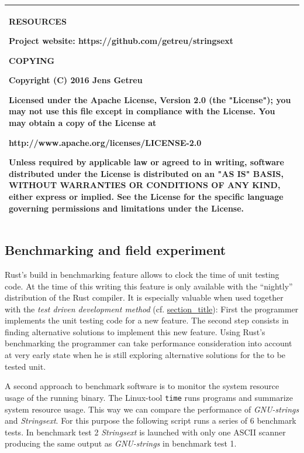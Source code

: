 \begin{longtable}[]{@{}l@{}}
\begin{minipage}[t]{0.97\columnwidth}
\textbf{RESOURCES}

\textbf{Project website:} https://github.com/getreu/stringsext

\textbf{COPYING}

Copyright (C) 2016 Jens Getreu

Licensed under the Apache License, Version 2.0 (the "License"); you may
not use this file except in compliance with the License. You may obtain
a copy of the License at

http://www.apache.org/licenses/LICENSE-2.0

Unless required by applicable law or agreed to in writing, software
distributed under the License is distributed on an "AS IS" BASIS,
WITHOUT WARRANTIES OR CONDITIONS OF ANY KIND, either express or implied.
See the License for the specific language governing permissions and
limitations under the License.\strut
\end{minipage}\tabularnewline
\bottomrule
\end{longtable}

\hypertarget{_benchmarking_and_field_experiment}{\subsection{Benchmarking
and field experiment}\label{_benchmarking_and_field_experiment}}

Rust's build in benchmarking feature allows to clock the time of unit
testing code. At the time of this writing this feature is only available
with the ``nightly'' distribution of the Rust compiler. It is especially
valuable when used together with the \emph{test driven development
method} (cf.
\protect\hyperlink{_test_driven_development}{section\_title}): First the
programmer implements the unit testing code for a new feature. The
second step consists in finding alternative solutions to implement this
new feature. Using Rust's benchmarking the programmer can take
performance consideration into account at very early state when he is
still exploring alternative solutions for the to be tested unit.

A second approach to benchmark software is to monitor the system
resource usage of the running binary. The Linux-tool \texttt{time} runs
programs and summarize system resource usage. This way we can compare
the performance of \emph{GNU-strings} and \emph{Stringsext}. For this
purpose the following script runs a series of 6 benchmark tests. In
benchmark test 2 \emph{Stringsext} is launched with only one ASCII
scanner producing the same output as \emph{GNU-strings} in benchmark
test 1.

